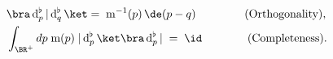 \begin{equation} \label{orthcomp} \begin{aligned}
{} & \bra\,{\rm d}_p^\flat\,|\,{\rm d}_q^\flat\,\ket = \;{\rm m}^{-1}(p)\,\de(p-q)
\qquad\qquad\;\text{\rm (Orthogonality)}, \\
{}& 
\int_{\BR^+}dp \;{\rm m}(p) \;|\,{\rm d}_p^\flat\,\ket \bra\,{\rm d}_p^\flat\,|
\;= \;\id \qquad \qquad\text{\rm (Completeness)}.
\end{aligned}\end{equation} 
